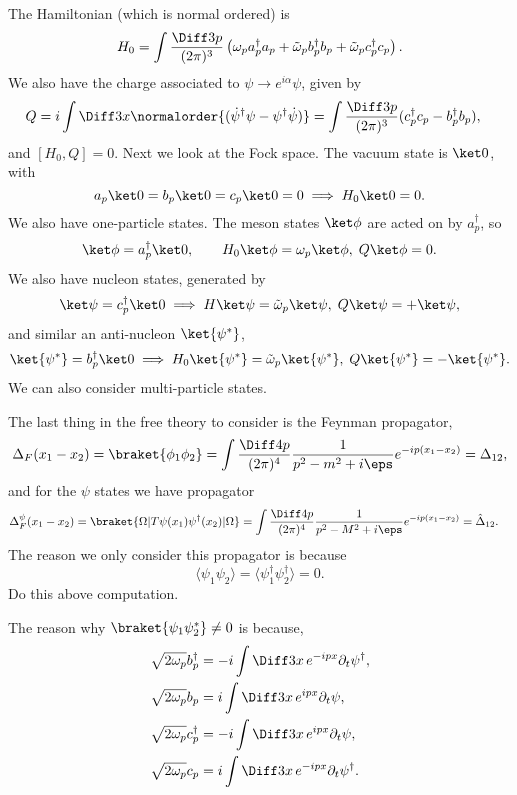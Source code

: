 \documentclass[12pt]{article}
\begin{document}
The Hamiltonian (which is normal ordered) is
\[
H_0 = \int \frac{\Diff3p}{(2\pi)^3} \left( \omega_p a_p^{\dagger} a_p + \tilde \omega_p b_p^{\dagger} b_p + \tilde \omega_p c_p^{\dagger} c_p \right).
\]
We also have the charge associated to $\psi \to e^{i\alpha} \psi$, given by
\begin{align*}
	Q &= i \int \Diff 3x \normalorder{( \dot \psi^{\dagger} \psi - \psi^{\dagger} \dot \psi)} = \int \frac{\Diff 3p}{(2 \pi)^3} (c_p^{\dagger} c_p - b_p^{\dagger} b_p),
\end{align*}
and $[H_0, Q] = 0$. Next we look at the Fock space. The vacuum state is $\ket 0$, with
\[
a_p \ket 0 = b_p \ket 0 = c_p \ket 0 = 0 \implies H_0 \ket 0 = 0.
\]
We also have one-particle states. The meson states $\ket \phi$ are acted on by $a_p^{\dagger}$, so
\[
\ket \phi = a_p^{\dagger} \ket 0, \qquad H_0 \ket \phi = \omega_p \ket \phi, \; Q \ket \phi = 0.
\]
We also have nucleon states, generated by
\[
\ket \psi = c_p^{\dagger} \ket 0 \implies H \ket \psi = \tilde \omega_p \ket \psi, \; Q \ket \psi = + \ket \psi,
\]
and similar an anti-nucleon $\ket{\psi^{\ast}}$,
\[
	\ket{\psi^{\ast}} = b_p^{\dagger} \ket 0 \implies H_0 \ket{\psi^{\ast}} = \tilde \omega_p \ket{\psi^{\ast}}, \; Q \ket{\psi^{\ast}} = - \ket{\psi^{\ast}}.
\]
We can also consider multi-particle states.

The last thing in the free theory to consider is the Feynman propagator,
\[
	\Delta_F(x_1 - x_2) = \braket{\phi_1 \phi_2} = \int \frac{\Diff 4 p}{(2 \pi)^4} \frac{1}{p^2 - m^2 + i \eps} e^{-ip(x_1 - x_2)} = \Delta_{12},
\]
and for the $\psi$ states we have propagator
\begin{align*}
	\Delta^{\psi}_F(x_1 - x_2) &= \braket{\Omega | T \psi(x_1) \psi^{\dagger}(x_2) | \Omega} = \int \frac{\Diff 4 p}{(2 \pi)^{4}} \frac{1}{p^2 - M^2 + i \eps} e^{-ip(x_1 - x_2)} = \hat \Delta_{12}.
\end{align*}
The reason we only consider this propagator is because
\[
\langle \psi_1 \psi_2 \rangle = \langle \psi_1^{\dagger} \psi_2^{\dagger} \rangle = 0.
\]
Do this above computation.

The reason why $\braket{\psi_1 \psi_2^{\ast}} \neq 0$ is because,
\begin{align*}
	\sqrt{2 \omega_p} b_p^{\dagger} &= - i \int \Diff 3 x \, e^{-ipx} \partial_t \psi^{\dagger}, \\
	\sqrt{2 \omega_p} b_p &= i \int \Diff 3 x \, e^{ipx} \partial_t \psi, \\
	\sqrt{2 \omega_p} c_p^{\dagger} &= -i \int \Diff 3x \, e^{ipx} \partial_t \psi, \\
	\sqrt{2 \omega_p} c_p &= i \int \Diff 3 x \, e^{-ipx} \partial_t \psi^{\dagger}.
\end{align*}
\end{document}
